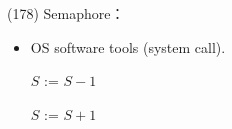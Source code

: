 \begin{theorem}{(178)} Semaphore：\begin{itemize}
        \item OS software tools (system call).
        \begin{algorithm}[H]
            \caption{$wait(S)$ ($P(S)$).}
            \begin{algorithmic}[1]
                 
                    \EndWhile
                    \State $S$ := $S - 1$
                \EndFunction
            \end{algorithmic}
        \end{algorithm}
        \begin{algorithm}[H]
            \caption{$signal(S)$ ($V(S)$).}
            \begin{algorithmic}[1]
                 
                    \State $S$ := $S + 1$
                \EndFunction
            \end{algorithmic}
        \end{algorithm}
    \end{itemize}
\end{theorem}

